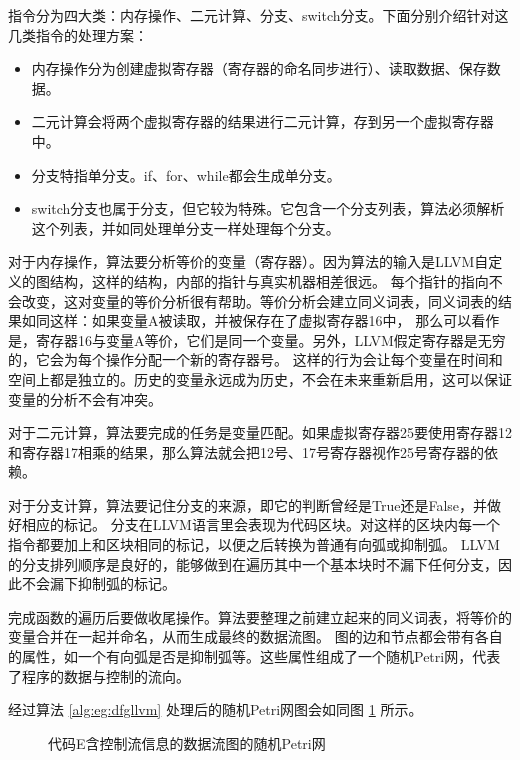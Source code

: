 指令分为四大类：内存操作、二元计算、分支、switch分支。下面分别介绍针对这几类指令的处理方案：

{
\begin{itemize}
    \addtolength{\itemindent}{2.5em}
    \item 内存操作分为创建虚拟寄存器（寄存器的命名同步进行）、读取数据、保存数据。
    \item 二元计算会将两个虚拟寄存器的结果进行二元计算，存到另一个虚拟寄存器中。
    \item 分支特指单分支。if、for、while都会生成单分支。
    \item switch分支也属于分支，但它较为特殊。它包含一个分支列表，算法必须解析这个列表，并如同处理单分支一样处理每个分支。
\end{itemize}
}

对于内存操作，算法要分析等价的变量（寄存器）。因为算法的输入是LLVM自定义的图结构，这样的结构，内部的指针与真实机器相差很远。
每个指针的指向不会改变，这对变量的等价分析很有帮助。等价分析会建立同义词表，同义词表的结果如同这样：如果变量A被读取，并被保存在了虚拟寄存器16中，
那么可以看作是，寄存器16与变量A等价，它们是同一个变量。另外，LLVM假定寄存器是无穷的，它会为每个操作分配一个新的寄存器号。
这样的行为会让每个变量在时间和空间上都是独立的。历史的变量永远成为历史，不会在未来重新启用，这可以保证变量的分析不会有冲突。

对于二元计算，算法要完成的任务是变量匹配。如果虚拟寄存器25要使用寄存器12和寄存器17相乘的结果，那么算法就会把12号、17号寄存器视作25号寄存器的依赖。

对于分支计算，算法要记住分支的来源，即它的判断曾经是True还是False，并做好相应的标记。
分支在LLVM语言里会表现为代码区块。对这样的区块内每一个指令都要加上和区块相同的标记，以便之后转换为普通有向弧或抑制弧。
LLVM的分支排列顺序是良好的，能够做到在遍历其中一个基本块时不漏下任何分支，因此不会漏下抑制弧的标记。

完成函数的遍历后要做收尾操作。算法要整理之前建立起来的同义词表，将等价的变量合并在一起并命名，从而生成最终的数据流图。
图的边和节点都会带有各自的属性，如一个有向弧是否是抑制弧等。这些属性组成了一个随机Petri网，代表了程序的数据与控制的流向。

经过算法 \ref{alg:eg:dfgllvm} 处理后的随机Petri网图会如同图 \ref{fig:eg:dfgctrlpnet} 所示。

\newsavebox{\egdfgctrlpnet}
\begin{figure}[!hbt]
\centering
\usebox{\egdfgctrlpnet}
\caption{代码E含控制流信息的数据流图的随机Petri网} \label{fig:eg:dfgctrlpnet}
\end{figure}

